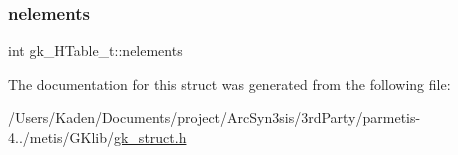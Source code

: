 \subsubsection{\texorpdfstring{nelements}{nelements}}
{\footnotesize\ttfamily int gk\+\_\+\+H\+Table\+\_\+t\+::nelements}



The documentation for this struct was generated from the following file\+:\begin{DoxyCompactItemize}
\item 
/\+Users/\+Kaden/\+Documents/project/\+Arc\+Syn3sis/3rd\+Party/parmetis-\/4../metis/\+G\+Klib/\hyperlink{a00080}{gk\+\_\+struct.\+h}\end{DoxyCompactItemize}
